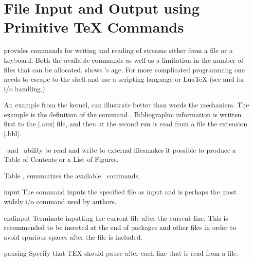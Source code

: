 
\chapter{File Input and Output using Primitive TeX Commands}

\tex provides commands for writing and reading of streams
either from a file or a keyboard. Both the available commands as well as a limitation in the number of files that can be allocated, shows \tex's age. For more complicated programming one needs to escape to the shell and use a scripting language or LuaTeX (see  and  for  i/o handling.)

An example from the \latexe kernel, can illustrate better than
words the mechanism. The example is the definition of
the command . Bibliographic information is written first to the |.aux| file, and then at the second run is read from a file the extension |.bbl|.


\tex\ and \latex\  ability to read and write to external filesmakes it possible to produce
a Table of Contents or a List of Figures. 


Table , summarizes the available \tex\ commands. 



\begin{docCommand*}{input} {}
The command  inputs the specified file as \tex input and is perhaps the most widely  i/o command used by authors. 
\end{docCommand*}

\begin{texexample}{}{}
\meaning
\end{texexample}



\begin{docCommand}{endinput}{}
 Terminate inputting the current file after the current line. This is recommended to be inserted at the
end of packages and other files in order to avoid spurious spaces after the file is included.
\end{docCommand}

\begin{docCommand*}{pausing}{}
  Specify that TEX should pause after each line that is read from a file.
\end{docCommand*}

